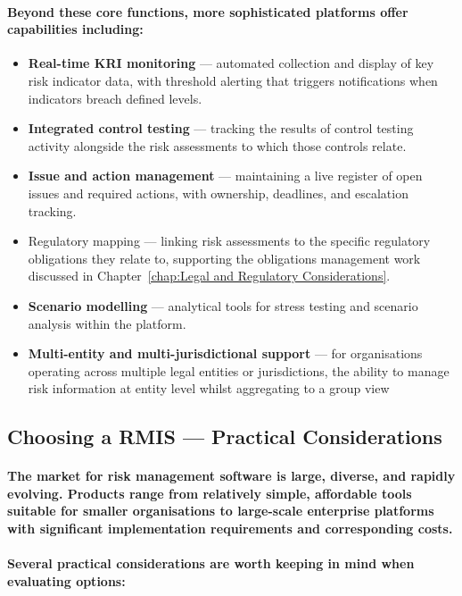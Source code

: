 \paragraph{Beyond these core functions, more sophisticated platforms offer capabilities including:}
\begin{itemize}
    \item{\textbf{Real-time KRI monitoring} — automated collection and display of key risk indicator data, with threshold alerting that triggers notifications when indicators breach defined levels.}
    \item{\textbf{Integrated control testing} — tracking the results of control testing activity alongside the risk assessments to which those controls relate.}
    \item{\textbf{Issue and action management} — maintaining a live register of open issues and required actions, with ownership, deadlines, and escalation tracking.}
    \item{Regulatory mapping — linking risk assessments to the specific regulatory obligations they relate to, supporting the obligations management work discussed in Chapter~\ref{chap:Legal and Regulatory Considerations}.}
    \item{\textbf{Scenario modelling} — analytical tools for stress testing and scenario analysis within the platform.}
    \item{\textbf{Multi-entity and multi-jurisdictional support} — for organisations operating across multiple legal entities or jurisdictions, the ability to manage risk information at entity level whilst aggregating to a group view}
\end{itemize}

\subsection{Choosing a RMIS — Practical Considerations}
\paragraph{The market for risk management software is large, diverse, and rapidly evolving. Products range from relatively simple, affordable tools suitable for smaller organisations to large-scale enterprise platforms with significant implementation requirements and corresponding costs.}
\paragraph{Several practical considerations are worth keeping in mind when evaluating options:}
